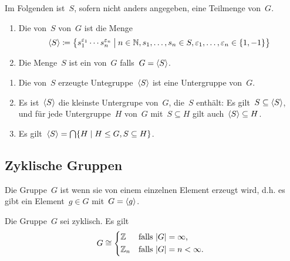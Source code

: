 \begin{convention}
  Im Folgenden ist~$S$, sofern nicht anders angegeben, eine Teilmenge von~$G$.
\end{convention}

\begin{definition}
  \leavevmode
  \begin{enumerate}
    \item
      Die von~$S$  von~$G$ ist die Menge
      \[
        \gen{S}
        \defined
        \bigl\{
          s_1^{\varepsilon_1} \dotsm s_n^{\varepsilon_n}
        \suchthat[\big]
          n \in \Natural,
          s_1, \dotsc, s_n \in S,
          \varepsilon_1, \dotsc, \varepsilon_n \in \{1, -1\}
        \bigr\}
      \]
    \item
      Die Menge~$S$ ist ein  von~$G$ falls~$G = \langle S\rangle$.
  \end{enumerate}
\end{definition}

\begin{proposition}
  \leavevmode
  \begin{enumerate}
    \item
      Die von~$S$ erzeugte Untegruppe~$\langle S\rangle$ ist eine Untergruppe von~$G$.
    \item
      Es ist~$\langle S\rangle$ die kleinste Untergrupe von~$G$, die~$S$ enthält:
      Es gilt~$S \subseteq \langle S\rangle$, und für jede Untergruppe~$H$ von~$G$ mit~$S \subseteq H$ gilt auch~$\langle S\rangle \subseteq H$.
    \item
      Es gilt~$\gen{S} = \bigcap \{ H \suchthat H \subgroupeq G, S \subseteq H \}$.
  \end{enumerate}
\end{proposition}



\subsection{Zyklische Gruppen}

\begin{definition}
  Die Gruppe~$G$ ist  wenn sie von einem einzelnen Element erzeugt wird, d.h. es gibt ein Element~$g \in G$ mit~$G = \langle g\rangle$.
\end{definition}

\begin{theorem}
  Die Gruppe~$G$ sei zyklisch.
  Es gilt
  \[
    G
    \cong
    \begin{cases*}
        \Integer
        &
        falls~$\card{G} = \infty$,
        \\
        \Integer_n
        &
        falls~$\card{G} = n < \infty$.
    \end{cases*}
  \]
\end{theorem}

